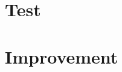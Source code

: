 \documentclass{article}
\begin{document}
\section{Test}
\label{sec:test}












\section{Improvement}
\label{sec:improvement}
\end{document}
